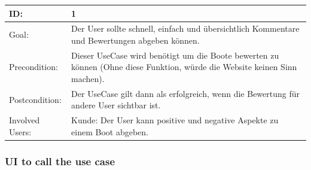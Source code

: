 \documentclass[12pt]{article}
\theoremstyle{definition}
\begin{document}
\begin{tabular}{|p{.2\linewidth}|p{.65\linewidth}|}
\hline 
ID: & 1 \\ \hline
Goal: & Der User sollte schnell, einfach und übersichtlich Kommentare und Bewertungen abgeben können. \\ \hline
Precondition: & Dieser UseCase wird benötigt um die Boote bewerten zu können (Ohne diese Funktion, würde die Website keinen Sinn machen). \\ \hline
Postcondition: & Der UseCase gilt dann als erfolgreich, wenn die Bewertung für andere User sichtbar ist. \\ \hline
Involved Users: &Kunde: Der User kann positive und negative Aspekte zu einem Boot abgeben. \\ \hline
\end{tabular}

\subsubsection{UI to call the use case}
\end{document}
